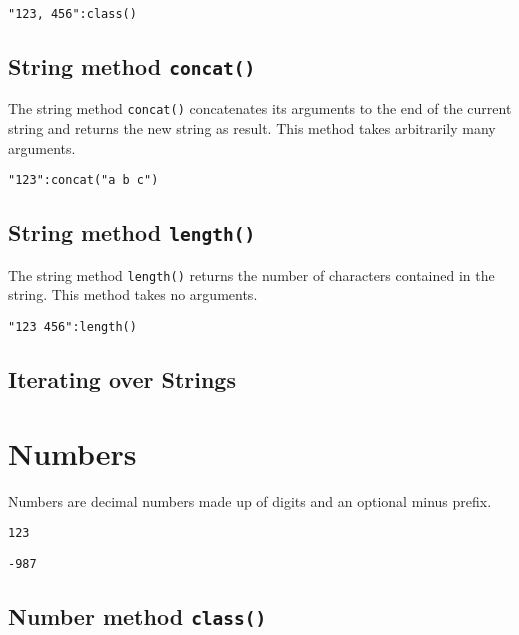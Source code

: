 \documentclass[11pt,a4paper]{scrbook}
\begin{document}
\begin{lstlisting}[language=BibTool]
"123, 456":class()
\end{lstlisting}

\subsection{String method \texttt{concat()}}

The string method \texttt{concat()} concatenates its arguments to the end of
the current string and returns the new string as result.
This method takes arbitrarily many arguments.

\begin{lstlisting}[language=BibTool]
"123":concat("a b c")
\end{lstlisting}

\subsection{String method \texttt{length()}}

The string method \texttt{length()} returns the number of characters contained
in the string. This method takes no arguments.

\begin{lstlisting}[language=BibTool]
"123 456":length()
\end{lstlisting}


\subsection{Iterating over Strings}


\section{Numbers}

Numbers are decimal numbers made up of digits and an optional minus prefix.


\begin{lstlisting}[language=BibTool]
123
\end{lstlisting}


\begin{lstlisting}[language=BibTool]
-987
\end{lstlisting}



\subsection{Number method \texttt{class()}}
\end{document}
